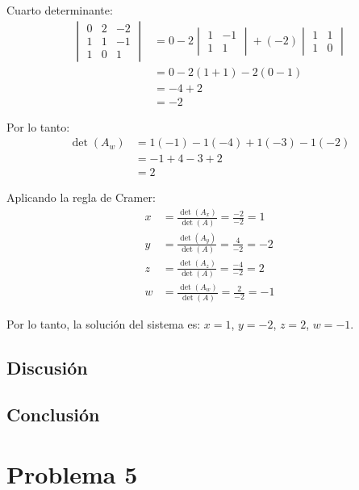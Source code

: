 \documentclass{article}
\begin{document}
Cuarto determinante:
\begin{align}
    \begin{vmatrix} 0 & 2 & -2 \\ 1 & 1 & -1 \\ 1 & 0 & 1 \end{vmatrix} &= 0 - 2 \begin{vmatrix} 1 & -1 \\ 1 & 1 \end{vmatrix} + (-2) \begin{vmatrix} 1 & 1 \\ 1 & 0 \end{vmatrix} \\
    &= 0 - 2(1 + 1) - 2(0 - 1) \\
    &= -4 + 2 \\
    &= -2
\end{align}

Por lo tanto:
\begin{align}
    \det(A_w) &= 1(-1) - 1(-4) + 1(-3) - 1(-2) \\
    &= -1 + 4 - 3 + 2 \\
    &= 2
\end{align}

Aplicando la regla de Cramer:
\begin{align}
x &= \frac{\det(A_x)}{\det(A)} = \frac{-2}{-2} = 1 \\
y &= \frac{\det(A_y)}{\det(A)} = \frac{4}{-2} = -2 \\
z &= \frac{\det(A_z)}{\det(A)} = \frac{-4}{-2} = 2 \\
w &= \frac{\det(A_w)}{\det(A)} = \frac{2}{-2} = -1
\end{align}

Por lo tanto, la solución del sistema es: $x = 1$, $y = -2$, $z = 2$, $w = -1$.


\subsection{Discusión}

\subsection{Conclusión}

\section{Problema 5}
\end{document}
